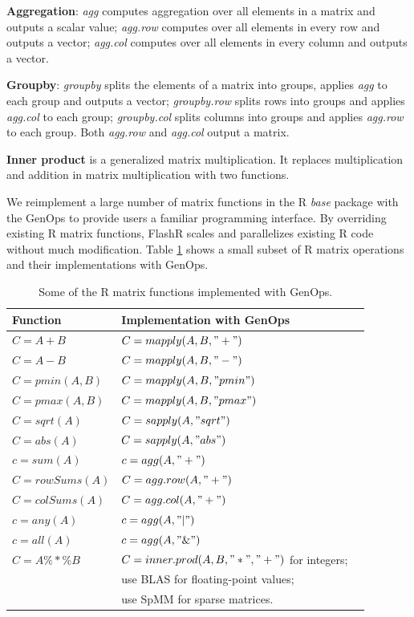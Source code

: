 \noindent \textbf{Aggregation}: \textit{agg} computes aggregation over
all elements in a matrix and outputs a scalar value; \textit{agg.row}
computes over all elements in every row and outputs a vector;
\textit{agg.col} computes over all elements in every column and
outputs a vector.

\noindent \textbf{Groupby}: \textit{groupby} splits the elements of a matrix
into groups, applies \textit{agg} to each group and outputs a vector;
\textit{groupby.row} splits rows into groups and applies \textit{agg.col}
to each group; \textit{groupby.col} splits columns into groups and applies
\textit{agg.row} to each group. Both \textit{agg.row} and \textit{agg.col}
output a matrix.

\noindent \textbf{Inner product} is a generalized matrix multiplication.
It replaces multiplication and addition in matrix multiplication with
two functions.

We reimplement a large number of matrix functions in the R \textit{base}
package with the GenOps to provide users a familiar programming interface.
By overriding existing R matrix functions, FlashR scales and parallelizes
existing R code without much modification. Table \ref{tbl:Rfuns} shows
a small subset of R matrix operations and their implementations
with GenOps.

\begin{table}
\begin{center}
\caption{Some of the R matrix functions implemented with GenOps.}
\vspace{-10pt}
\footnotesize
\begin{tabular}{|l|l|l|}
\hline
Function & Implementation with GenOps \\
\hline
$C=A+B$ & $C=mapply(A, B, "+")$ \\
$C=A-B$ & $C=mapply(A, B, "-")$ \\
$C=pmin(A,B)$ & $C=mapply(A, B, "pmin")$ \\
$C=pmax(A,B)$ & $C=mapply(A, B, "pmax")$ \\
$C=sqrt(A)$ & $C=sapply(A, "sqrt")$ \\
$C=abs(A)$ & $C=sapply(A, "abs")$ \\
\hline
$c=sum(A)$ & $c=agg(A, "+")$ \\
$C=rowSums(A)$ & $C=agg.row(A, "+")$ \\
$C=colSums(A)$ & $C=agg.col(A, "+")$ \\
$c=any(A)$ & $c=agg(A, "|")$ \\
$c=all(A)$ & $c=agg(A, "\&")$ \\
\hline
$C=A \%*\% B$ & $C=inner.prod(A, B, "*", "+")$ for integers; \\
 & use BLAS for floating-point values; \\
 & use SpMM \cite{SEM_SpMM} for sparse matrices. \\
\hline
\end{tabular}
\normalsize
\label{tbl:Rfuns}
\end{center}
\end{table}

